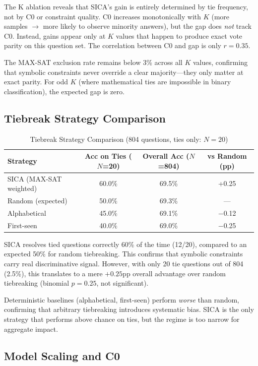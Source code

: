 \documentclass[11pt]{article}
\begin{document}
The K ablation reveals that SICA's gain is entirely determined by tie frequency, not by C0 or constraint quality. C0 increases monotonically with $K$ (more samples $\rightarrow$ more likely to observe minority answers), but the gap does \emph{not} track C0. Instead, gains appear only at $K$ values that happen to produce exact vote parity on this question set. The correlation between C0 and gap is only $r=0.35$.

The MAX-SAT exclusion rate remains below 3\% across all $K$ values, confirming that symbolic constraints never override a clear majority---they only matter at exact parity. For odd $K$ (where mathematical ties are impossible in binary classification), the expected gap is zero.

\subsection{Tiebreak Strategy Comparison}

\begin{table}[h]
\centering
\caption{Tiebreak Strategy Comparison (804 questions, ties only: $N=20$)}
\label{tab:tiebreak}
\begin{tabular}{lccc}
\toprule
Strategy & Acc on Ties ($N$=20) & Overall Acc ($N$=804) & vs Random (pp) \\
\midrule
SICA (MAX-SAT weighted) & 60.0\% & 69.5\% & +0.25 \\
Random (expected) & 50.0\% & 69.3\% & --- \\
Alphabetical & 45.0\% & 69.1\% & $-$0.12 \\
First-seen & 40.0\% & 69.0\% & $-$0.25 \\
\bottomrule
\end{tabular}
\end{table}

SICA resolves tied questions correctly 60\% of the time (12/20), compared to an expected 50\% for random tiebreaking. This confirms that symbolic constraints carry real discriminative signal. However, with only 20 tie questions out of 804 (2.5\%), this translates to a mere $+0.25$pp overall advantage over random tiebreaking (binomial $p=0.25$, not significant).

Deterministic baselines (alphabetical, first-seen) perform \emph{worse} than random, confirming that arbitrary tiebreaking introduces systematic bias. SICA is the only strategy that performs above chance on ties, but the regime is too narrow for aggregate impact.

\subsection{Model Scaling and C0}
\end{document}
